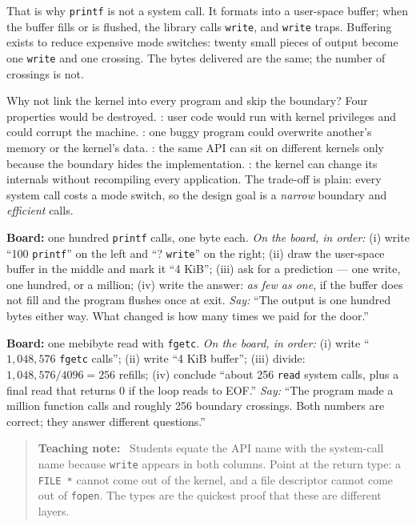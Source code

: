 \documentclass[11pt]{article}
\newenvironment{teachingaside}{\begin{quote}\small\color{primary-gold}\textbf{Teaching note:}\ }{\end{quote}}
\begin{document}
That is why \texttt{printf} is not a system call. It formats into a user-space buffer; when the buffer fills or is flushed, the library calls \texttt{write}, and \texttt{write} traps. Buffering exists to reduce expensive mode switches: twenty small pieces of output become one \texttt{write} and one crossing. The bytes delivered are the same; the number of crossings is not.

Why not link the kernel into every program and skip the boundary? Four properties would be destroyed. : user code would run with kernel privileges and could corrupt the machine. : one buggy program could overwrite another's memory or the kernel's data. : the same API can sit on different kernels only because the boundary hides the implementation. : the kernel can change its internals without recompiling every application. The trade-off is plain: every system call costs a mode switch, so the design goal is a \emph{narrow} boundary and \emph{efficient} calls.

\textbf{Board:} one hundred \texttt{printf} calls, one byte each. \emph{On the board, in order:} (i) write ``100 \texttt{printf}'' on the left and ``? \texttt{write}'' on the right; (ii) draw the user-space buffer in the middle and mark it ``4 KiB''; (iii) ask for a prediction --- one write, one hundred, or a million; (iv) write the answer: \emph{as few as one}, if the buffer does not fill and the program flushes once at exit. \emph{Say:} ``The output is one hundred bytes either way. What changed is how many times we paid for the door.''

\textbf{Board:} one mebibyte read with \texttt{fgetc}. \emph{On the board, in order:} (i) write ``$1{,}048{,}576$ \texttt{fgetc} calls''; (ii) write ``4 KiB buffer''; (iii) divide: $1{,}048{,}576 / 4096 = 256$ refills; (iv) conclude ``about 256 \texttt{read} system calls, plus a final read that returns 0 if the loop reads to EOF.'' \emph{Say:} ``The program made a million function calls and roughly 256 boundary crossings. Both numbers are correct; they answer different questions.''

\begin{teachingaside}
Students equate the API name with the system-call name because \texttt{write} appears in both columns. Point at the return type: a \texttt{FILE *} cannot come out of the kernel, and a file descriptor cannot come out of \texttt{fopen}. The types are the quickest proof that these are different layers.
\end{teachingaside}
\end{document}
